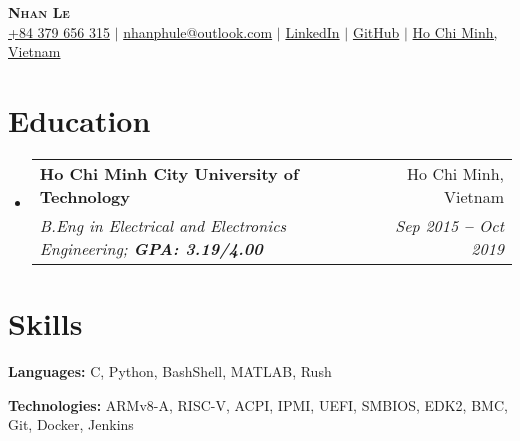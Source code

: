 \documentclass[letterpaper,11pt]{article}
\makeatletter
\newcommand{\resumeEducationHeading}[4]{
  \vspace{-2pt}\item
    \begin{tabular*}{0.97\textwidth}[t]{l@{\extracolsep{\fill}}r}
      \textbf{#1} & #2 \\
      \textit{\small#3} & \textit{\small #4} \\
    \end{tabular*}\vspace{-5pt}
}
\newcommand{\resumeSubHeadingListStart}{\begin{itemize}[leftmargin=0.15in, label={}]}
\newcommand{\resumeSubHeadingListEnd}{\end{itemize}}
\makeatother
\begin{document}

\begin{center}
    \textbf{\Huge \scshape Nhan Le} \\ \vspace{3pt}
    \small
    \faMobile \hspace{.5pt} \href{tel:+84379656315}{+84 379 656 315}
    $|$
    \faAt \hspace{.5pt} \href{mailto:nhanphule@outlook.com}{nhanphule@outlook.com}
    $|$
    \faLinkedinSquare \hspace{.5pt} \href{https://www.linkedin.com/in/nhanlephu}{LinkedIn}
    $|$
    \faGithub \hspace{.5pt} \href{https://github.com/nhanplee}{GitHub}
    $|$
    \faMapMarker \hspace{.5pt} \href{https://www.google.com/maps/place/Th%C3%A0nh+ph%E1%BB%91+H%E1%BB%93+Ch%C3%AD+Minh,+Vi%E1%BB%87t+Nam/@10.7547485,106.5304219,11z/data=!3m1!4b1!4m6!3m5!1s0x317529292e8d3dd1:0xf15f5aad773c112b!8m2!3d10.8230989!4d106.6296638!16zL20vMGhuNGg?hl=vi-VN&entry=ttu}{Ho Chi Minh, Vietnam}
\end{center}




\section{Education}
  \vspace{3pt}
  \resumeSubHeadingListStart
    \resumeEducationHeading
      {Ho Chi Minh City University of Technology}{Ho Chi Minh, Vietnam}
      {B.Eng in Electrical and Electronics Engineering; \textbf{GPA: 3.19/4.00}}{Sep 2015 \textbf{--} Oct 2019}
  \resumeSubHeadingListEnd




\section{Skills}
  \vspace{2pt}
  \resumeSubHeadingListStart
    \small{\item{
        
        \textbf{Languages:}{ C, Python, BashShell, MATLAB, Rush} \\ \vspace{3pt}
        
        \textbf{Technologies:}{ ARMv8-A, RISC-V, ACPI, IPMI, UEFI, SMBIOS, EDK2, BMC, Git, Docker, Jenkins} \\ \vspace{3pt}
        
    }}
  \resumeSubHeadingListEnd
\end{document}
